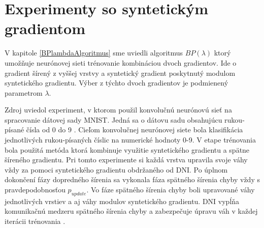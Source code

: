 \newpage
\appendix
{}
\chapter{Experimenty so syntetickým gradientom}
\label{SGexperimets}

V kapitole \ref{BPlambdaAlgoritmus} sme uviedli algoritmus $BP(\lambda)$ ktorý umožňuje neurónovej sieti trénovanie kombináciou dvoch gradientov. Ide o gradient šírený z vyššej vrstvy a syntetický gradient poskytnutý modulom syntetického gradientu. Výber z týchto dvoch gradientov je podmienený parametrom $\lambda$. 

Zdroj \cite{Jaderberg2016} uviedol experiment, v ktorom použil konvolučnú neurónovú sieť na spracovanie dátovej sady MNIST. Jedná sa o dátovu sadu obsahujúcu rukou-písané čísla od 0 do 9 \cite{yann1998mnist}. Cieľom konvolučnej neurónovej siete bola klasifikácia jednotlivých rukou-písaných číslic na numerické hodnoty 0-9. V etape trénovania bola použitá metóda ktorá kombinuje využitie syntetického gradientu a spätne šíreného gradientu. Pri tomto experimente si každá vrstva upravila svoje váhy vždy za pomoci syntetického gradientu obdržaného od DNI. Po úplnom dokončení fázy dopredného šírenia sa vykonala fáza spätného šírenia chyby vždy s pravdepodobnosťou $p_{update}$. Vo fáze spätného šírenia chyby boli upravované váhy jednotlivých vrstiev a aj váhy modulov syntetického gradientu. DNI vypĺňa komunikačnú medzeru spätného šírenia chyby a zabezpečuje úpravu váh v každej iterácii trénovania \cite{Jaderberg2016}.

